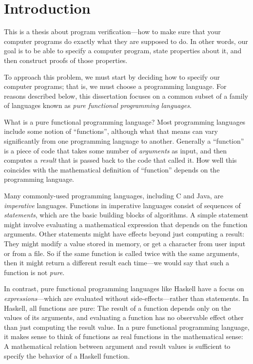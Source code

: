 \chapter{Introduction}
\label{ch:intro}

This is a thesis about program verification---how to make sure that your computer programs do exactly what they are supposed to do. In other words, our goal is to be able to specify a computer program, state properties about it, and then construct proofs of those properties.

To approach this problem, we must start by deciding how to specify our computer programs; that is, we must choose a programming language. For reasons described below, this dissertation focuses on a common subset of a family of languages known as \emph{pure functional programming languages}.


What is a pure functional programming language? Most programming languages include some notion of ``functions'', although what that means can vary significantly from one programming language to another. Generally a ``function'' is a piece of code that takes some number of \emph{arguments} as input, and then computes a \emph{result} that is passed back to the code that called it. How well this coincides with the mathematical definition of ``function'' depends on the programming language.

Many commonly-used programming languages, including C and Java, are \emph{imperative} languages. Functions in imperative languages consist of sequences of \emph{statements}, which are the basic building blocks of algorithms. A simple statement might involve evaluating a mathematical expression that depends on the function arguments. Other statements might have effects beyond just computing a result: They might modify a value stored in memory, or get a character from user input or from a file. So if the same function is called twice with the same arguments, then it might return a different result each time---we would say that such a function is not \emph{pure}.

In contrast, pure functional programming languages like Haskell \cite{HaskellReport, Bird1998Introduction} have a focus on \emph{expressions}---which are evaluated without side-effects---rather than statements. In Haskell, all functions are pure: The result of a function depends only on the values of its arguments, and evaluating a function has no observable effect other than just computing the result value. In a pure functional programming language, it makes sense to think of functions as real functions in the mathematical sense: A mathematical relation between argument and result values is sufficient to specify the behavior of a Haskell function.

